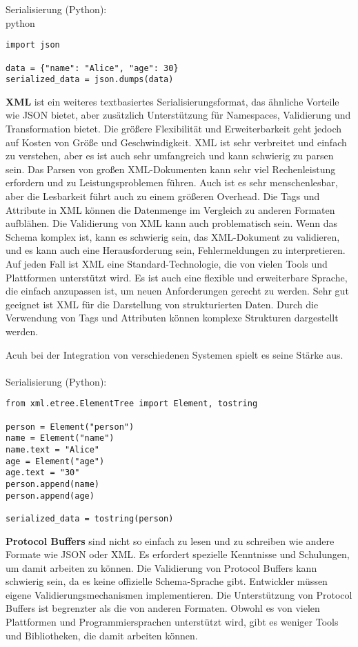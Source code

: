 \documentclass[../vs-script-first-v01.tex]{subfiles}
\begin{document}
Serialisierung (Python):\\
python\\
\begin{lstlisting}[caption={JSON},captionpos=b,label={lst:json}]
import json

data = {"name": "Alice", "age": 30}
serialized_data = json.dumps(data)

\end{lstlisting}
\textbf{XML} ist ein weiteres textbasiertes Serialisierungsformat, das ähnliche Vorteile wie JSON bietet, aber zusätzlich Unterstützung für Namespaces, Validierung und Transformation bietet. Die größere Flexibilität und Erweiterbarkeit geht jedoch auf Kosten von Größe und Geschwindigkeit.
XML ist sehr verbreitet und einfach zu verstehen, aber es ist auch sehr umfangreich und kann schwierig zu parsen sein. Das Parsen von großen XML-Dokumenten kann sehr viel Rechenleistung erfordern und zu Leistungsproblemen führen.
Auch ist es sehr menschenlesbar, aber die Lesbarkeit führt auch zu einem größeren Overhead. Die Tags und Attribute in XML können die Datenmenge im Vergleich zu anderen Formaten aufblähen. Die Validierung von XML kann auch problematisch sein. Wenn das Schema komplex ist, kann es schwierig sein, das XML-Dokument zu validieren, und es kann auch eine Herausforderung sein, Fehlermeldungen zu interpretieren. Auf jeden Fall ist XML eine Standard-Technologie, die von vielen Tools und Plattformen unterstützt wird. Es ist auch eine flexible und erweiterbare Sprache, die einfach anzupassen ist, um neuen Anforderungen gerecht zu werden.
Sehr gut geeignet ist XML für die Darstellung von strukturierten Daten. Durch die Verwendung von Tags und Attributen können komplexe Strukturen dargestellt werden.

Acuh bei der Integration von verschiedenen Systemen spielt es seine Stärke aus.\\\\

Serialisierung (Python):\\
\begin{lstlisting}[caption={XML},captionpos=b,label={lst:xml}]
from xml.etree.ElementTree import Element, tostring

person = Element("person")
name = Element("name")
name.text = "Alice"
age = Element("age")
age.text = "30"
person.append(name)
person.append(age)

serialized_data = tostring(person)
\end{lstlisting}
\textbf{Protocol Buffers} sind nicht so einfach zu lesen und zu schreiben wie andere Formate wie JSON oder XML. Es erfordert spezielle Kenntnisse und Schulungen, um damit arbeiten zu können. Die Validierung von Protocol Buffers kann schwierig sein, da es keine offizielle Schema-Sprache gibt. Entwickler müssen eigene Validierungsmechanismen implementieren. Die Unterstützung von Protocol Buffers ist begrenzter als die von anderen Formaten. Obwohl es von vielen Plattformen und Programmiersprachen unterstützt wird, gibt es weniger Tools und Bibliotheken, die damit arbeiten können.
\end{document}
